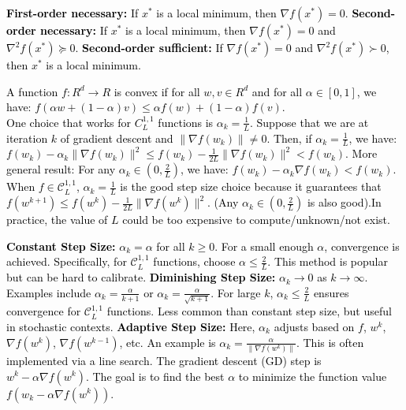\documentclass[a4paper,6pt]{extarticle}
\newcommand{\mybox}[2]{
    \begin{tcolorbox}[colback=color!5!white, colframe=color!75!black, boxsep=2pt, top=1pt, bottom=1pt, left=2pt, right=2pt, arc=3pt, outer arc=3pt, title={\textbf{#1}}]
    {\fontsize{5pt}{5pt}\selectfont \textcolor{black}{#2}}
    \end{tcolorbox}
}
\begin{document}
    \fontsize{7pt}{8pt}\selectfont

    \begin{multicols}{2}

        \mybox{Gradient Descent}{

            \textbf{First-order necessary:} If \( x^* \) is a local minimum, then \( \nabla f(x^*) = 0 \).
            \textbf{Second-order necessary:} If \( x^* \) is a local minimum, then \( \nabla f(x^*) = 0 \) and \( \nabla^2 f(x^*) \succeq 0 \).
            \textbf{Second-order sufficient:} If \( \nabla f(x^*) = 0 \) and \( \nabla^2 f(x^*) \succ 0 \), then \( x^* \) is a local minimum.

            A function $f: R^d \rightarrow R$ is convex if for all $w, v \in R^d$ and for all $\alpha \in [0, 1]$, we have:
            $f(\alpha w + (1 - \alpha) v) \leq \alpha f(w) + (1 - \alpha) f(v)$.\\

            One choice that works for $C^{1,1}_{L}$ functions is $\alpha_k = \frac{1}{L}$. Suppose that we are at iteration $k$ of gradient descent and $\| \nabla f(w_k) \| \neq 0$. Then, if $\alpha_k = \frac{1}{L}$, we have:$f(w_k) - \alpha_k \|\nabla f(w_k)\|^2 \leq f(w_k) - \frac{1}{2L} \|\nabla f(w_k)\|^2 < f(w_{k})$. More general result: For any $\alpha_k \in (0, \frac{2}{L})$, we have: $f(w_k) - \alpha_k \nabla f(w_k) < f(w_k)$. When $f \in \mathcal{C}^{1, 1}_L$, $\alpha_k = \frac{1}{L}$ is the good step size choice because it guarantees that $f(w^{k+1}) \leq f(w^k) - \frac{1}{2L} \|\nabla f(w^k)\|^2$. (Any $\alpha_k \in (0, \frac{2}{L})$ is also good).In practice, the value of $L$ could be too expensive to compute/unknown/not exist.

            \textbf{Constant Step Size:} $\alpha_k = \alpha$ for all $k \geq 0$. For a small enough $\alpha$, convergence is achieved. Specifically, for $\mathcal{C}^{1, 1}_L$ functions, choose $\alpha \leq \frac{2}{L}$. This method is popular but can be hard to calibrate. \textbf{Diminishing Step Size:} $\alpha_k \rightarrow 0$ as $k \rightarrow \infty$. Examples include $\alpha_k = \frac{\alpha}{k+1}$ or $\alpha_k = \frac{\alpha}{\sqrt{k+1}}$. For large $k$, $\alpha_k \leq \frac{2}{L}$ ensures convergence for $\mathcal{C}^{1, 1}_L$ functions. Less common than constant step size, but useful in stochastic contexts. \textbf{Adaptive Step Size:} Here, $\alpha_k$ adjusts based on $f$, $w^k$, $\nabla f(w^k)$, $\nabla f(w^{k-1})$, etc. An example is $\alpha_k = \frac{\alpha}{\|\nabla f(w^k)\|}$. This is often implemented via a line search. The gradient descent (GD) step is $w^k - \alpha \nabla f(w^k)$. The goal is to find the best $\alpha$ to minimize the function value $f(w_k - \alpha \nabla f(w^k))$.


}
\end{multicols}
\end{document}
